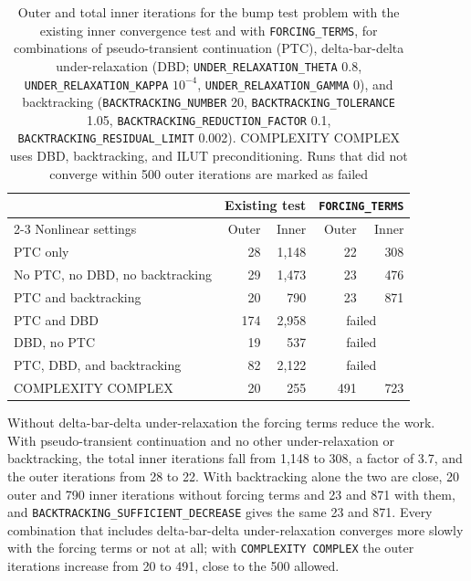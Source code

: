 \begin{table}[!ht]
	\caption[Outer and inner iterations for the bump test problem with and without forcing terms]{Outer and total inner iterations for the bump test problem with the existing inner convergence test and with \texttt{FORCING\_TERMS}, for combinations of pseudo-transient continuation (PTC), delta-bar-delta under-relaxation (DBD; \texttt{UNDER\_RELAXATION\_THETA} 0.8, \texttt{UNDER\_RELAXATION\_KAPPA} $10^{-4}$, \texttt{UNDER\_RELAXATION\_GAMMA} 0), and backtracking (\texttt{BACKTRACKING\_NUMBER} 20, \texttt{BACKTRACKING\_TOLERANCE} 1.05, \texttt{BACKTRACKING\_REDUCTION\_FACTOR} 0.1, \texttt{BACKTRACKING\_RESIDUAL\_LIMIT} 0.002). COMPLEXITY COMPLEX uses DBD, backtracking, and ILUT preconditioning. Runs that did not converge within 500 outer iterations are marked as failed}
	\label{tab:imsforcingbump}
	\small
	\centering
	\begin{tabular}{l rr rr}
		\hline
		\hline
		& \multicolumn{2}{c}{Existing test} & \multicolumn{2}{c}{\texttt{FORCING\_TERMS}} \\
		\cline{2-3} \cline{4-5}
		Nonlinear settings & Outer & Inner & Outer & Inner \\
		\hline
		PTC only & 28 & 1,148 & 22 & 308 \\
		No PTC, no DBD, no backtracking & 29 & 1,473 & 23 & 476 \\
		PTC and backtracking & 20 & 790 & 23 & 871 \\
		PTC and DBD & 174 & 2,958 & \multicolumn{2}{c}{failed} \\
		DBD, no PTC & 19 & 537 & \multicolumn{2}{c}{failed} \\
		PTC, DBD, and backtracking & 82 & 2,122 & \multicolumn{2}{c}{failed} \\
		COMPLEXITY COMPLEX & 20 & 255 & 491 & 723 \\
		\hline
	\end{tabular}
\end{table}

Without delta-bar-delta under-relaxation the forcing terms reduce the work. With pseudo-transient continuation and no other under-relaxation or backtracking, the total inner iterations fall from 1,148 to 308, a factor of 3.7, and the outer iterations from 28 to 22. With backtracking alone the two are close, 20 outer and 790 inner iterations without forcing terms and 23 and 871 with them, and \texttt{BACKTRACKING\_SUFFICIENT\_DECREASE} gives the same 23 and 871. Every combination that includes delta-bar-delta under-relaxation converges more slowly with the forcing terms or not at all; with \texttt{COMPLEXITY COMPLEX} the outer iterations increase from 20 to 491, close to the 500 allowed.

